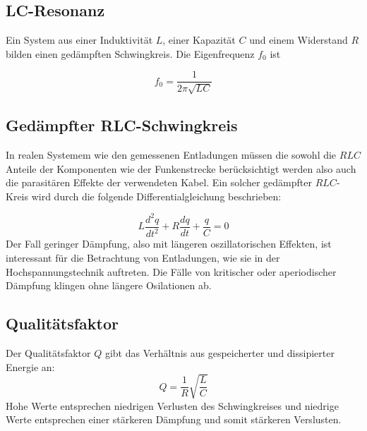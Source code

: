 \subsection{LC-Resonanz}
Ein System aus einer Induktivität \(L\), einer Kapazität \(C\) und einem Widerstand \(R\) bilden einen gedämpften Schwingkreis. Die Eigenfrequenz \(f_0\) ist

\begin{equation}
f_0 = \frac{1}{2\pi \sqrt{LC}}
\end{equation}

\subsection{Gedämpfter RLC-Schwingkreis}
In realen Systemem wie den gemessenen Entladungen müssen die sowohl die \(RLC\) Anteile der Komponenten wie der Funkenstrecke berücksichtigt werden also auch die parasitären Effekte der verwendeten Kabel. Ein solcher gedämpfter \(RLC\)-Kreis wird durch die folgende Differentialgleichung beschrieben:

\begin{equation}
L\frac{d^2q}{dt^2} + R\frac{dq}{dt} + \frac{q}{C} = 0
\end{equation}
Der Fall geringer Dämpfung, also mit längeren oszillatorischen Effekten, ist interessant für die Betrachtung von Entladungen, wie sie in der Hochspannungstechnik auftreten. Die Fälle von kritischer oder aperiodischer Dämpfung klingen ohne längere Osilationen ab.
\subsection{Qualitätsfaktor}
Der Qualitätsfaktor \(Q\) gibt das Verhältnis aus gespeicherter und dissipierter Energie an:
\begin{equation}
Q = \frac{1}{R} \sqrt{\frac{L}{C}}
\end{equation}
Hohe Werte entsprechen niedrigen Verlusten des Schwingkreises und niedrige Werte entsprechen einer stärkeren Dämpfung und somit stärkeren Verslusten.

